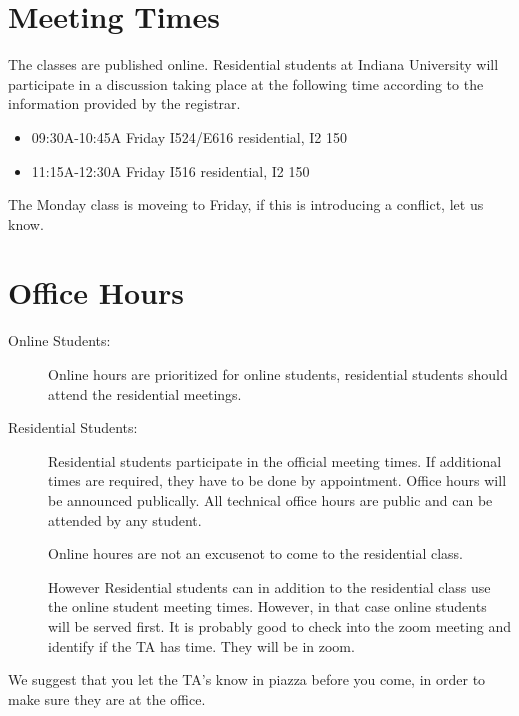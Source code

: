 \section{Meeting Times}\label{meeting-times}

The classes are published online. Residential students at Indiana
University will participate in a discussion taking place at the
following time according to the information provided by the registrar.

\begin{itemize}
\item 09:30A-10:45A Friday I524/E616 residential, I2 150
\item  11:15A-12:30A Friday I516 residential, I2 150
\end{itemize}

The Monday class is moveing to Friday, if this is introducing a
conflict, let us know.

\section{Office Hours}\label{office-hours}

\begin{description}

\item[Online Students:] Online hours are prioritized for online students,
  residential students should attend the residential meetings. 

\item[Residential Students:] Residential students participate in the
  official meeting times. If additional times are required, they have
  to be done by appointment. Office hours will be announced
  publically. All technical office hours are public and can be
  attended by any student.

  Online houres are not an excusenot to come to the residential class.

  However Residential students can in addition to the residential
  class use the online student meeting times.  However, in that case
  online students will be served first. It is probably good to check
  into the zoom meeting and identify if the TA has time. They will be
  in zoom.

\end{description}

We suggest that you let the TA's know in piazza before you come, in order to make
sure they are at the office.


